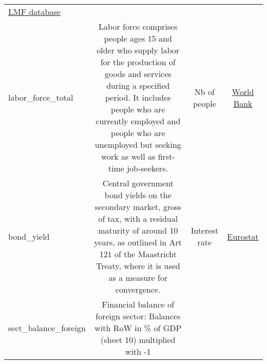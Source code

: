 \documentclass[]{article}
\begin{document}
\begin{longtable}[]{@{}lccc@{}}
\begin{minipage}[t]{0.15\columnwidth}
\href{http://www.philiplane.org/EWN.html}{LMF database}\strut
\end{minipage}\tabularnewline
\begin{minipage}[t]{0.14\columnwidth}\raggedright\strut
labor\_force\_total\strut
\end{minipage} & \begin{minipage}[t]{0.36\columnwidth}\centering\strut
Labor force comprises people ages 15 and older who supply labor for the
production of goods and services during a specified period. It includes
people who are currently employed and people who are unemployed but
seeking work as well as first-time job-seekers.\strut
\end{minipage} & \begin{minipage}[t]{0.24\columnwidth}\centering\strut
Nb of people\strut
\end{minipage} & \begin{minipage}[t]{0.15\columnwidth}\centering\strut
\href{https://data.worldbank.org/indicator/SL.UEM.TOTL.ZS}{World
Bank}\strut
\end{minipage}\tabularnewline
\begin{minipage}[t]{0.14\columnwidth}\raggedright\strut
bond\_yield\strut
\end{minipage} & \begin{minipage}[t]{0.36\columnwidth}\centering\strut
Central government bond yields on the secondary market, gross of tax,
with a residual maturity of around 10 years, as outlined in Art 121 of
the Maastricht Treaty, where it is used as a measure for
convergence.\strut
\end{minipage} & \begin{minipage}[t]{0.24\columnwidth}\centering\strut
Interest rate\strut
\end{minipage} & \begin{minipage}[t]{0.15\columnwidth}\centering\strut
\href{http://appsso.eurostat.ec.europa.eu/nui/show.do?dataset=irt_lt_mcby_a\&lang=en}{Eurostat}\strut
\end{minipage}\tabularnewline
\begin{minipage}[t]{0.14\columnwidth}\raggedright\strut
sect\_balance\_foreign\strut
\end{minipage} & \begin{minipage}[t]{0.36\columnwidth}\centering\strut
Financial balance of foreign sector: Balances with RoW in \% of GDP
(sheet 10) multiplied with -1\strut
\end{minipage} & \begin{minipage}[t]{0.24\columnwidth}\centering\strut

\end{minipage}
\end{longtable}
\end{document}
